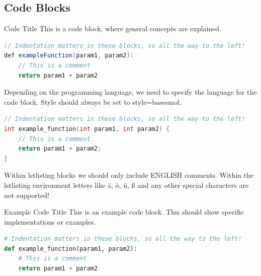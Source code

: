 \raggedcolumns
\columnbreak

\subsection{Code Blocks}

\begin{code}{Code Title}
    This is a code block, where general concepts are explained.
\begin{lstlisting}[language=Java, style=basesmol]
// Indentation matters in these blocks, so all the way to the left!
def exampleFunction(param1, param2):
    // This is a comment
    return param1 + param2
\end{lstlisting}

    Depending on the programming language, we need to specify the language for the code block. Style should always be set to style=basesmol.

\begin{lstlisting}[language=C, style=basesmol]
// Indentation matters in these blocks, so all the way to the left!
int example_function(int param1, int param2) {
    // This is a comment
    return param1 + param2;
}
\end{lstlisting}

     Within lstlisting blocks we should only include ENGLISH comments. 
    Within the lstlisting environment letters like ä, ö, ü, ß and any other special characters are not supported!
\end{code}

\begin{examplecode}{Example Code Title}
    This is an example code block. This should show specific implementations or examples.
\begin{lstlisting}[language=Python, style=basesmol]
# Indentation matters in these blocks, so all the way to the left!
def example_function(param1, param2):
    # This is a comment
    return param1 + param2
\end{lstlisting}
\end{examplecode}




        

    




